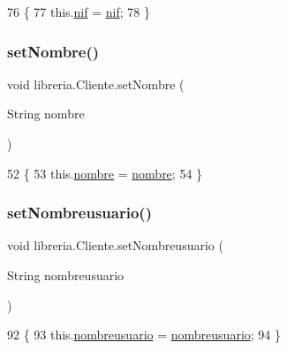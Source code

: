 \begin{DoxyCode}
76                                    \{
77         this.\mbox{\hyperlink{classlibreria_1_1_cliente_a6d50af0b6448c8ac66e9ae08c436cdfe}{nif}} = \mbox{\hyperlink{classlibreria_1_1_cliente_a6d50af0b6448c8ac66e9ae08c436cdfe}{nif}};
78     \}
\end{DoxyCode}
\mbox{\label{classlibreria_1_1_cliente_a6c073e25efa594766ab6f322bc566d1b}} 
\subsubsection{\texorpdfstring{set\+Nombre()}{setNombre()}}
{\footnotesize\ttfamily void libreria.\+Cliente.\+set\+Nombre (\begin{DoxyParamCaption}\item[{String}]{nombre }\end{DoxyParamCaption})\hspace{0.3cm}{\ttfamily [inline]}}


\begin{DoxyCode}
52                                          \{
53         this.\mbox{\hyperlink{classlibreria_1_1_cliente_ab7862ac1d181becc7cf8a88ecf07b570}{nombre}} = \mbox{\hyperlink{classlibreria_1_1_cliente_ab7862ac1d181becc7cf8a88ecf07b570}{nombre}};
54     \}
\end{DoxyCode}
\mbox{\label{classlibreria_1_1_cliente_aace12b3fcc4e17f5aa871230ed25878d}} 
\subsubsection{\texorpdfstring{set\+Nombreusuario()}{setNombreusuario()}}
{\footnotesize\ttfamily void libreria.\+Cliente.\+set\+Nombreusuario (\begin{DoxyParamCaption}\item[{String}]{nombreusuario }\end{DoxyParamCaption})\hspace{0.3cm}{\ttfamily [inline]}}


\begin{DoxyCode}
92                                                        \{
93         this.\mbox{\hyperlink{classlibreria_1_1_cliente_a3018645e586ef4b1abef3ac1a7f2a464}{nombreusuario}} = \mbox{\hyperlink{classlibreria_1_1_cliente_a3018645e586ef4b1abef3ac1a7f2a464}{nombreusuario}};
94     \}
\end{DoxyCode}
\mbox{\label{classlibreria_1_1_cliente_a4f67320d89bdf56838f95fa9cf493e45}} 
